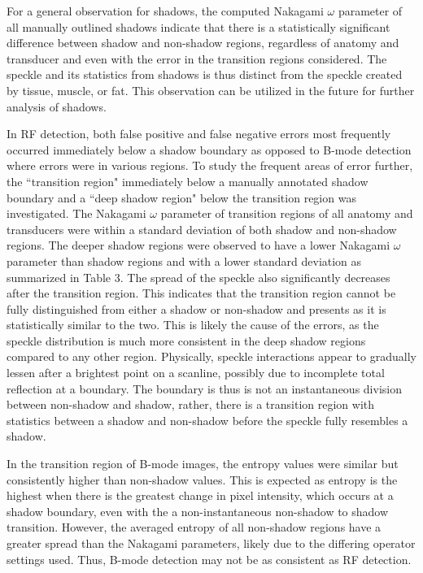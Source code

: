 \documentclass[authoryear,preprint,review,12pt]{elsarticle}
\begin{document}
For a general observation for shadows, the computed Nakagami $\omega$ parameter of all manually outlined shadows indicate that there is a statistically significant difference between shadow and non-shadow regions, regardless of anatomy and transducer and even with the error in the transition regions considered. The speckle and its statistics from shadows is thus distinct from the speckle created by tissue, muscle, or fat. This observation can be utilized in the future for further analysis of shadows. 

In RF detection, both false positive and false negative errors most frequently occurred immediately below a shadow boundary as opposed to B-mode detection where errors were in various regions. To study the frequent areas of error further, the ``transition region" immediately below a manually annotated shadow boundary and a ``deep shadow region" below the transition region was investigated. The Nakagami $\omega$ parameter of transition regions  of all anatomy and transducers were within a standard deviation of both shadow and non-shadow regions. The deeper shadow regions were observed to have a lower Nakagami $\omega$ parameter than shadow regions and with a lower standard deviation as summarized in Table 3. The spread of the speckle also significantly decreases after the transition region. This indicates that the transition region cannot be fully distinguished from either a shadow or non-shadow and presents as it is statistically similar to the two. This is likely the cause of the errors, as the speckle distribution is much more consistent in the deep shadow regions compared to any other region. Physically, speckle interactions appear to gradually lessen after a brightest point on a scanline, possibly due to incomplete total reflection at a boundary. The boundary is thus is not an instantaneous division between non-shadow and shadow, rather, there is a transition region with statistics between a shadow and non-shadow before the speckle fully resembles a shadow.

In the transition region of B-mode images, the entropy values were similar but consistently higher than non-shadow values. This is expected as entropy is the highest when there is the greatest change in pixel intensity, which occurs at a shadow boundary, even with the a non-instantaneous non-shadow to shadow transition. However, the averaged entropy of all non-shadow regions have a greater spread than the Nakagami parameters, likely due to the differing operator settings used. Thus, B-mode detection may not be as consistent as RF detection.
\end{document}
